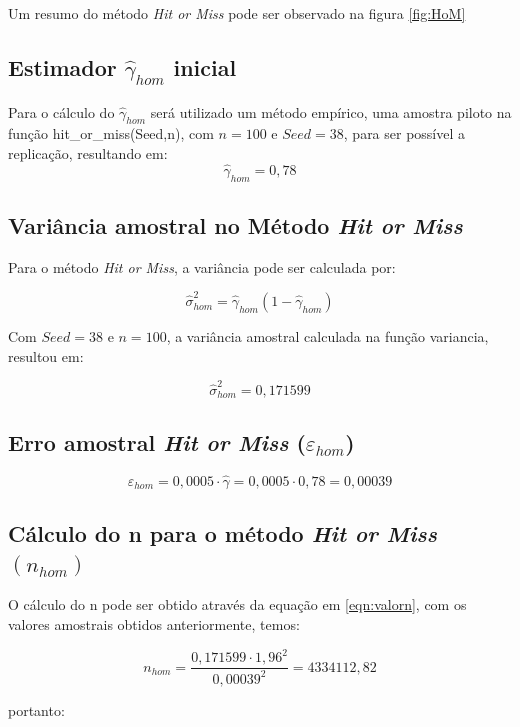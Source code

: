 \documentclass{article}
\begin{document}
Um resumo do método \textit{Hit or Miss} pode ser observado na figura \ref{fig:HoM} 


\subsection{Estimador $\hat{\gamma}_{hom}$ inicial}
Para o cálculo do $\hat{\gamma}_{hom}$ será utilizado um método empírico, uma amostra piloto na função hit\_or\_miss(Seed,n), com $n=100$ e $Seed=38$, para ser possível a replicação, resultando em:
\[
    \hat{\gamma}_{hom} = 0,78
\]

\subsection{Variância amostral no Método \textit{Hit or Miss}}

Para o método \textit{Hit or Miss}, a variância pode ser calculada por:

\begin{equation*}
    \hat{\sigma}_{hom}^2 = \hat{\gamma}_{hom}(1-\hat{\gamma}_{hom})
\end{equation*}

Com $Seed=38$ e $n=100$, a variância amostral calculada na função variancia, resultou em:

\[
    \hat{\sigma}_{hom}^2 = 0,171599
\]
\subsection{Erro amostral \textit{Hit or Miss} ($\varepsilon_{hom}$)}

\begin{equation*}
    \varepsilon_{hom} = 0,0005\cdot\hat{\gamma} = 0,0005\cdot0,78 = 0,00039
\end{equation*}

\subsection{Cálculo do n para o método \textit{Hit or Miss} $(n_{hom})$}

O cálculo do n pode ser obtido através da equação em \ref{eqn:valorn}, com os valores amostrais obtidos anteriormente, temos:

\begin{equation*}
    n_{hom} = \frac{0,171599\cdot1,96^2}{0,00039^2} = 4334112,82
\end{equation*}

portanto:
\end{document}
